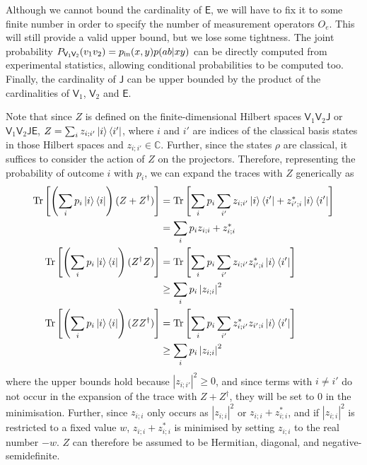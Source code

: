 \documentclass[10pt, a4paper]{article}
\numberwithin{equation}{section} %
\theoremstyle{definition}
\theoremstyle{plain}
\newcommand{\abs}[1]{\left\lvert#1\right\rvert}
\newcommand{\?}{\mathrel{?}} %
\newcommand{\C}{\mathbb{C}} %
\newcommand{\Tr}{\mathrm{Tr}} %
\newcommand{\crv}[1]{\mathsf{#1}}
\begin{document}
    Although we cannot bound the cardinality of \(\crv{E}\), we will have to fix it to some finite number in order to specify the number of measurement operators \(O_e\). This will still provide a valid upper bound, but we lose some tightness. The joint probability \(P_{\crv{V_1V_2}}(v_1v_2) = p_{\rm in}(x,y)p(ab|xy)\) can be directly computed from experimental statistics, allowing conditional probabilities to be computed too. Finally, the cardinality of \(\crv{J}\) can be upper bounded by the product of the cardinalities of \(\crv{V}_1\), \(\crv{V}_2\) and \(\crv{E}\).

    Note that since \(Z\) is defined on the finite-dimensional Hilbert spaces \(\crv{V}_1\crv{V}_2\crv{J}\) or \(\crv{V}_1\crv{V}_2\crv{JE}\), \(Z = \sum_{i} z_{i;i'} \ket{i}\bra{i'}\), where \(i\) and \(i'\) are indices of the classical basis states in those Hilbert spaces and \(z_{i;i'} \in \C\). Further, since the states \(\rho\) are classical, it suffices to consider the action of \(Z\) on the projectors. Therefore, representing the probability of outcome \(i\) with \(p_i\), we can expand the traces with \(Z\) generically as
  \begin{align}
    \Tr\left[\left(\sum_i p_i \ket{i}\bra{i}\right) (Z + Z^{\dagger})\right] &= 
    \Tr\left[ \sum_i p_i \sum_{i'} z_{i;i'} \ket{i}\bra{i'} + {z_{i';i}^*} \ket{i}\bra{i'} \right] \\
                                                            &= 
    \sum_i p_i z_{i;i} + {z_{i;i}^*} \\
    \Tr\left[\left(\sum_i p_i \ket{i}\bra{i}\right) (Z^{\dagger}Z)\right] &=
    \Tr\left[ \sum_i p_i \sum_{i'} z_{i;i'} {z_{i';i}^*} \ket{i}\bra{i'} \right] \\
                                                            &\geq 
    \sum_i p_i \abs{z_{i;i}}^2 \\
    \Tr\left[\left(\sum_i p_i \ket{i}\bra{i}\right) (ZZ^{\dagger})\right] &= 
    \Tr\left[ \sum_i p_i \sum_{i'} {z_{i;i'}^*} z_{i';i} \ket{i}\bra{i'} \right] \\
                                                            &\geq 
    \sum_i p_i \abs{z_{i;i}}^2
  \end{align}
  where the upper bounds hold because \(\abs{z_{i;i'}}^2 \geq 0\), and since terms with \(i \neq i'\) do not occur in the expansion of the trace with \(Z + Z^{\dagger}\), they will be set to 0 in the minimisation. Further, since \(z_{i;i}\) only occurs as \(\abs{z_{i;i}}^2\) or \(z_{i;i} + {z_{i;i}^*}\), and if \(\abs{z_{i;i}}^2\) is restricted to a fixed value \(w\), \(z_{i;i} + {z_{i;i}^*}\) is minimised by setting \(z_{i;i}\) to the real number \(-w\). \(Z\) can therefore be assumed to be Hermitian, diagonal, and negative-semidefinite.
\end{document}

